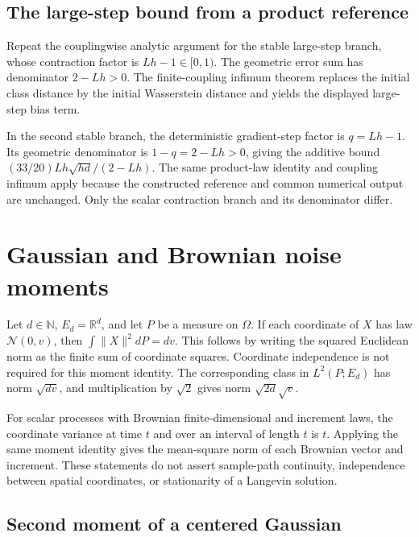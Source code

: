 \documentclass[11pt,a4paper]{article}
\begin{document}
\subsection{\texorpdfstring{The large-step bound from a product reference}{The large-step bound from a product reference}}


Repeat the couplingwise analytic argument for the stable large-step branch, whose contraction factor is \(Lh-1\in[0,1)\). The geometric error sum has denominator \(2-Lh>0\). The finite-coupling infimum theorem replaces the initial class distance by the initial Wasserstein distance and yields the displayed large-step bias term.



In the second stable branch, the deterministic gradient-step factor is \(q=Lh-1\). Its geometric denominator is \(1-q=2-Lh>0\), giving the additive bound \((33/20)Lh\sqrt{hd}/(2-Lh)\). The same product-law identity and coupling infimum apply because the constructed reference and common numerical output are unchanged. Only the scalar contraction branch and its denominator differ.


\section{\texorpdfstring{Gaussian and Brownian noise moments}{Gaussian and Brownian noise moments}}


Let \(d\in\mathbb N\), \(E_d=\mathbb R^d\), and let \(P\) be a measure on \(\Omega\). If each coordinate of \(X\) has law \(\mathcal N(0,v)\), then \(\int\|X\|^2dP=dv\). This follows by writing the squared Euclidean norm as the finite sum of coordinate squares. Coordinate independence is not required for this moment identity. The corresponding class in \(L^2(P;E_d)\) has norm \(\sqrt{dv}\), and multiplication by \(\sqrt2\) gives norm \(\sqrt{2d}\sqrt v\).



For scalar processes with Brownian finite-dimensional and increment laws, the coordinate variance at time \(t\) and over an interval of length \(t\) is \(t\). Applying the same moment identity gives the mean-square norm of each Brownian vector and increment. These statements do not assert sample-path continuity, independence between spatial coordinates, or stationarity of a Langevin solution.


\subsection{\texorpdfstring{Second moment of a centered Gaussian}{Second moment of a centered Gaussian}}
\end{document}
